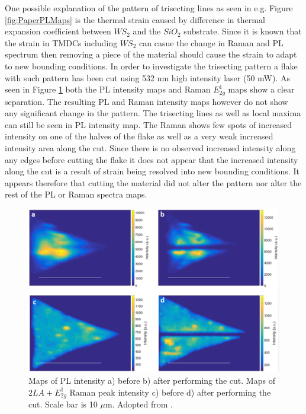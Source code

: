 One possible explanation of the pattern of trisecting lines as seen in e.g. Figure \ref{fig:PaperPLMaps} is the thermal strain caused by difference in thermal expansion coefficient between $WS_2$ and the $SiO_2$ substrate. Since it is known that the strain in TMDCs including $WS_2$ can casue the change in Raman and PL spectrum \cite{Liu2014}\cite{Hui2013} then removing a piece of the material should cause the strain to adapt to new bounding conditions. In order to investigate the trisecting pattern a flake with such pattern has been cut using 532 nm high intensity laser (50 mW). As seen in Figure \ref{fig:PaperSIMapsCutting} both the PL intensity maps and Raman $E^1_{2g}$ maps show a clear separation. The resulting PL and Raman intensity maps however do not show any significant change in the pattern. The trisecting lines as well as local maxima can still be seen in PL intensity map. The Raman shows few spots of increased intensity on one of the halves of the flake as well as a very weak increased intensity area along the cut. Since there is no observed increased intensity along any edges before cutting the flake it does not appear that the increased intensity along the cut is a result of strain being resolved into new bounding conditions. It appears therefore that cutting the material did not alter the pattern nor alter the rest of the PL or Raman spectra maps.

\begin{figure}[h]
	\begin{center}
		\includegraphics[scale=0.3]{PaperSIMapsCutting.png}
		\caption{Maps of PL intensity a) before b) after performing the cut. Maps of $2LA+E^1_{2g}$ Raman peak intensity c) before d) after performing the cut. Scale bar is 10 $\mu$m. Adopted from \cite{Reale2017}.}
		\label{fig:PaperSIMapsCutting}
	\end{center}
\end{figure}

